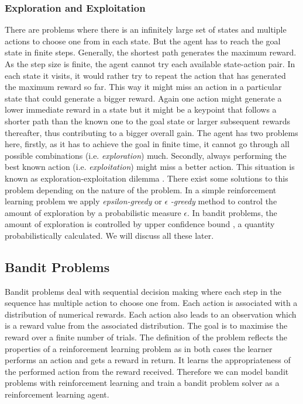 \documentclass[english]{tktltiki}
\begin{document}
\subsubsection{Exploration and Exploitation}

There are problems where there is an infinitely large set of states and multiple actions to choose one from in each state. But the agent has to reach the goal state in finite steps. Generally, the shortest path generates the maximum reward. As the step size is finite, the agent cannot try each available state-action pair. In each state it visits, it would rather try to repeat the action that has generated the maximum reward so far. This way it might miss an action in a particular state that could generate a bigger reward. Again one action might generate a lower immediate reward in a state but it might be a keypoint that follows a shorter path than the known one to the goal state or larger subsequent rewards thereafter, thus contributing to a bigger overall gain. The agent has two problems here, firstly, as it has to achieve the goal in finite time, it cannot go through all possible combinations (i.e. \textit{exploration}) much. Secondly, always performing the best known action (i.e. \textit{exploitation}) might miss a better action. This situation is known as exploration-exploitation dilemma \cite{reinforcement_learning}. There exist some solutions to this problem depending on the nature of the problem. In a simple reinforcement learning problem we apply \textit{epsilon-greedy} or $\epsilon$ \textit{-greedy} \cite{reinforcement_learning} method to control the amount of exploration by a probabilistic measure $\epsilon$. In bandit problems, the amount of exploration is controlled by upper confidence bound \cite{ucb}, a quantity probabilistically calculated. We will discuss all these later.

\subsection{Bandit Problems}

Bandit problems \cite{bandits} deal with sequential decision making where each step in the sequence has multiple action to choose one from. Each action is associated with a distribution of numerical rewards. Each action also leads to an observation which is a reward value from the associated distribution. The goal is to maximise the reward over a finite number of trials. The definition of the problem reflects the properties of a reinforcement learning problem as in both cases the learner performs an action and gets a reward in return. It learns the appropriateness of the performed action from the reward received. Therefore we can model bandit problems with reinforcement learning and train a bandit problem solver as a reinforcement learning agent.
\end{document}
